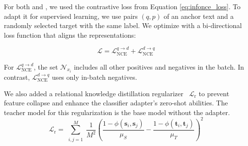 \documentclass[11pt]{article}
\begin{document}
For both \JEmbeddingVFiveTextSmall{} and \JEmbeddingVFiveTextNano{}, we used the contrastive loss from Equation \eqref{eq:infonce_loss}.
To adapt it for supervised learning, we use pairs $(q,p)$ of an anchor text and a randomly selected target with the same label.
We optimize with a bi-directional loss function that aligns the representations:

\begin{equation}
\mathcal{L} = \mathcal{L}_{\text{NCE}}^{q \rightarrow d} + \mathcal{L}_{\text{NCE}}^{d \rightarrow q}
\end{equation}


For $\mathcal{L}_{\text{NCE}}^{q \rightarrow d}$, the set $\mathcal{N}_{x_i}$ includes all other positives and negatives in the batch.
In contrast, $\mathcal{L}_{\text{NCE}}^{d \rightarrow q}$ uses only in-batch negatives.

We also added a relational knowledge distillation regularizer~\citep{park2019relational} $\mathcal{L}_{\text{r}}$ to prevent feature collapse and enhance the classifier adapter’s zero-shot abilities. The teacher model for this regularization is the base model without the adapter.
%
\begin{equation}
\mathcal{L}_{\text{r}} =
\sum_{\substack{i,j=1}}^{M}
\frac{1}{M^2}
\left(
\frac{1 - \phi(\bm{s}_i, \bm{s}_j)}{\mu_S}
-
\frac{1 - \phi(\bm{t}_i, \bm{t}_j)}{\mu_T}
\right)^2
\end{equation}
\end{document}
